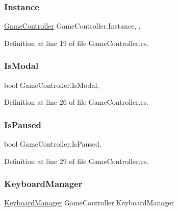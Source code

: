 \subsubsection{\texorpdfstring{Instance}{Instance}}
{\footnotesize\ttfamily \hyperlink{class_game_controller}{Game\+Controller} Game\+Controller.\+Instance\hspace{0.3cm}{\ttfamily [static]}, {\ttfamily [get]}, {}}



Definition at line 19 of file Game\+Controller.\+cs.

\mbox{\label{class_game_controller_a61cb8435fc41507058b6dc08419408a2}} 
\subsubsection{\texorpdfstring{Is\+Modal}{IsModal}}
{\footnotesize\ttfamily bool Game\+Controller.\+Is\+Modal\hspace{0.3cm}{\ttfamily [get]}, {\ttfamily [set]}}



Definition at line 26 of file Game\+Controller.\+cs.

\mbox{\label{class_game_controller_aca24b8d6c493a65fd81c1ba6ce88cc7d}} 
\subsubsection{\texorpdfstring{Is\+Paused}{IsPaused}}
{\footnotesize\ttfamily bool Game\+Controller.\+Is\+Paused\hspace{0.3cm}{\ttfamily [get]}, {\ttfamily [set]}}



Definition at line 29 of file Game\+Controller.\+cs.

\mbox{\label{class_game_controller_a24eb670688aa60cfbf34d183ac8d9bd7}} 
\subsubsection{\texorpdfstring{Keyboard\+Manager}{KeyboardManager}}
{\footnotesize\ttfamily \hyperlink{class_keyboard_manager}{Keyboard\+Manager} Game\+Controller.\+Keyboard\+Manager\hspace{0.3cm}{\ttfamily [get]}}



